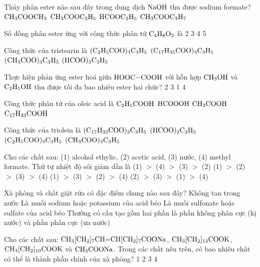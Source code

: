 \documentclass[12pt,a4paper]{article}
\begin{document}
\begin{ex}
Thủy phân ester nào sau đây trong dung dịch $\ce{NaOH}$ thu được sodium formate?
\choice
{$\ce{CH3COOCH3}$}
{$\ce{CH3COOC2H5}$}
{$\ce{HCOOC2H5}$}
{$\ce{CH3COOC3H7}$}
\loigiai{}
\end{ex}

\begin{ex}
Số đồng phân ester ứng với công thức phân tử $\ce{C4H8O2}$ là
\choice
{2}
{3}
{4}
{5}
\loigiai{}
\end{ex}

\begin{ex}
Công thức của tristearin là
\choice
{$\ce{(C2H5COO)3C3H5}$}
{$\ce{(C17H35COO)3C3H5}$}
{$\ce{(CH3COO)3C3H5}$}
{$\ce{(HCOO)3C3H5}$}
\loigiai{}
\end{ex}

\begin{ex}
Thực hiện phản ứng ester hoá giữa $\ce{HOOC-COOH}$ với hỗn hợp $\ce{CH3OH}$ và $\ce{C2H5OH}$ thu được tối đa bao nhiêu ester hai chức?
\choice
{2}
{3}
{1}
{4}
\loigiai{}
\end{ex}

\begin{ex}
Công thức phân tử của oleic acid là
\choice
{$\ce{C2H5COOH}$}
{$\ce{HCOOOH}$}
{$\ce{CH3COOH}$}
{$\ce{C17H33COOH}$}
\loigiai{}
\end{ex}

\begin{ex}
Công thức của triolein là
\choice
{$\ce{(C17H33COO)3C3H5}$}
{$\ce{(HCOO)3C3H5}$}
{$\ce{(C2H5COO)3C3H5}$}
{$\ce{(CH3COO)3C3H5}$}
\loigiai{}
\end{ex}

\begin{ex}
Cho các chất sau: (1) alcohol ethylic, (2) acetic acid, (3) nước, (4) methyl formate. Thứ tự nhiệt độ sôi giảm dần là
\choice
{(1) $>$ (4) $>$ (3) $>$ (2)}
{(1) $>$ (2) $>$ (3) $>$ (4)}
{(1) $>$ (3) $>$ (2) $>$ (4)}
{(2) $>$ (3) $>$ (1) $>$ (4)}
\loigiai{}
\end{ex}

\begin{ex}
Xà phòng và chất giặt rửa có đặc điểm chung nào sau đây?
\choice
{Không tan trong nước}
{Là muối sodium hoặc potassium của acid béo}
{Là muối sulfonate hoặc sulfate của acid béo}
{Thường có cấu tạo gồm hai phần là phần không phân cực (kị nước) và phần phân cực (ưa nước)}
\loigiai{}
\end{ex}

\begin{ex}
Cho các chất sau: $\ce{CH3[CH2]7CH=CH[CH2]7COONa}$, $\ce{CH3[CH2]14COOK}$, $\ce{CH3[CH2]10COOK}$ và $\ce{CH3COONa}$. Trong các chất nêu trên, có bao nhiêu chất có thể là thành phần chính của xà phòng?
\choice
{1}
{2}
{3}
{4}
\loigiai{}
\end{ex}
\end{document}
